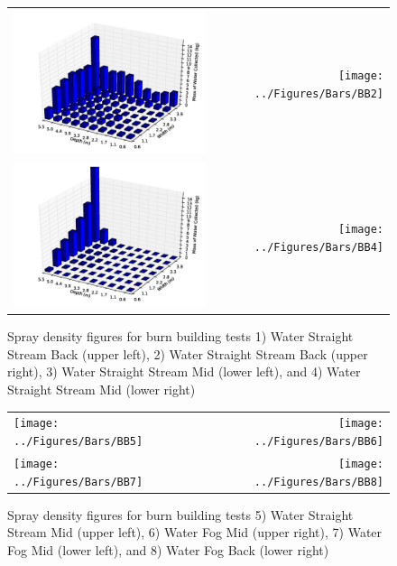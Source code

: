 \documentclass[12pt,oneside]{book}
\begin{document}
\begin{figure}[ht]
\begin{tabular*}{\textwidth}{lr}
\includegraphics[width=3.2in]{../Figures/Bars/BB1} &
\texttt{[image: ../Figures/Bars/BB2]} \\
\includegraphics[width=3.2in]{../Figures/Bars/BB3} &
\texttt{[image: ../Figures/Bars/BB4]}
\end{tabular*}
\caption{Spray density figures for burn building tests 1) Water Straight Stream Back (upper left), 2) Water Straight Stream Back (upper right), 3) Water Straight Stream Mid (lower left), and 4) Water Straight Stream Mid (lower right)}
\label{fig:bb_1_4}
\end{figure}

\clearpage

\begin{figure}[ht]
\begin{tabular*}{\textwidth}{lr}
\texttt{[image: ../Figures/Bars/BB5]} &
\texttt{[image: ../Figures/Bars/BB6]} \\
\texttt{[image: ../Figures/Bars/BB7]} &
\texttt{[image: ../Figures/Bars/BB8]}
\end{tabular*}
\caption{Spray density figures for burn building tests 5) Water Straight Stream Mid (upper left), 6) Water Fog Mid (upper right), 7) Water Fog Mid (lower left), and 8) Water Fog Back (lower right)}
\label{fig:bb_5_8}
\end{figure}
\end{document}
